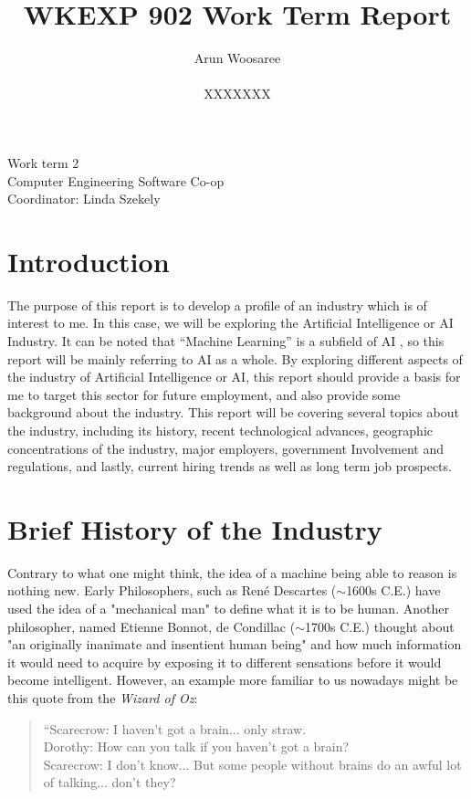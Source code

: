 \documentclass[letterpaper,12pt]{article}
\title{WKEXP 902 Work Term Report}
\author{Arun Woosaree \\ \\ XXXXXXX}
\begin{document}
\relax
\begin{titlepage}
 \maketitle
 \thispagestyle{empty} %
 \centering
 \large
 \vspace{1cm}
 Work term 2\\
 \vspace{1cm}
 Computer Engineering Software Co-op \\
 \vspace{1cm}
 Coordinator: Linda Szekely
\end{titlepage}

\section{Introduction}
The purpose of this report is to develop a profile of an industry which is of interest to me.
In this case, we will be exploring the Artificial Intelligence or AI Industry.
It can be noted that ``Machine Learning'' is a subfield of AI \cite{sasAIvsML},
so this report will be mainly referring to AI as a whole.
By exploring different aspects of the industry of Artificial Intelligence or AI, this report should
provide a basis for me to target this sector for future employment, and
also provide some background about the industry.
This report will be covering several topics about the industry,
including its history, recent technological advances, geographic
concentrations of the industry, major employers, government Involvement
and regulations, and lastly, current hiring trends as well as
long term job prospects.


\section{Brief History of the Industry}
Contrary to what one might think, the idea of a machine being able to reason is nothing new. 
Early Philosophers, such as René Descartes ($\sim$1600s C.E.) have used the idea of a "mechanical man"
to define what it is to be human.\cite{briefhistory}\cite{sep-descartes}
Another philosopher, named Etienne Bonnot, de Condillac\cite{briefhistory} ($\sim$1700s C.E.)
thought about "an originally inanimate and insentient human being"\cite{sep-condillac}
and how much information it would need to acquire by exposing it to different sensations
before it would become intelligent. However, an example more familiar to us nowadays
might be this quote from the \textit{Wizard of Oz}\cite{wizardofoz}:
\begin{quotation}
    \noindent“Scarecrow: I haven't got a brain... only straw.\\
    Dorothy: How can you talk if you haven't got a brain?\\
    Scarecrow: I don't know... But some people without brains do an awful lot of talking... don't they?\\
\end{quotation}
\end{document}
